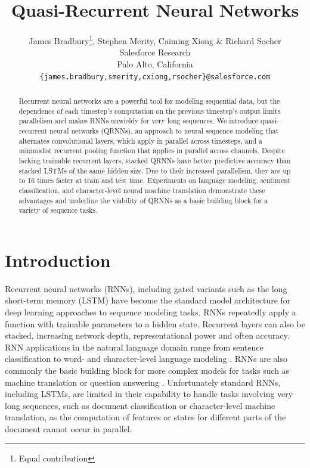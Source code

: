 \documentclass{article} %
\title{Quasi-Recurrent Neural Networks}
\author{James Bradbury\thanks{Equal contribution}, Stephen Merity\footnotemark[1], Caiming Xiong \& Richard Socher \\
Salesforce Research\\
Palo Alto, California \\
\texttt{\{james.bradbury,smerity,cxiong,rsocher\}@salesforce.com}}
\begin{document}
\maketitle

\begin{abstract}
Recurrent neural networks are a powerful tool for modeling sequential data, but the dependence of each timestep's computation on the previous timestep's output limits parallelism and makes RNNs unwieldy for very long sequences. We introduce quasi-recurrent neural networks (QRNNs), an approach to neural sequence modeling that alternates convolutional layers, which apply in parallel across timesteps, and a minimalist recurrent pooling function that applies in parallel across channels. Despite lacking trainable recurrent layers, stacked QRNNs have better predictive accuracy than stacked LSTMs of the same hidden size. Due to their increased parallelism, they are up to 16 times faster at train and test time.
Experiments on language modeling, sentiment classification, and character-level neural machine translation demonstrate these advantages and underline the viability of QRNNs as a basic building block for a variety of sequence tasks.
\end{abstract}

\section{Introduction}

Recurrent neural networks (RNNs), including gated variants such as the long short-term memory (LSTM) \citep{Hochreiter1997} have become the standard model architecture for deep learning approaches to sequence modeling tasks. RNNs repeatedly apply a function with trainable parameters to a hidden state. Recurrent layers can also be stacked, increasing network depth, representational power and often accuracy.
RNN applications in the natural language domain range from sentence classification \citep{Wang2015}
to word- and character-level language modeling \citep{Zaremba2014}. RNNs are also commonly the basic building block for more complex models for tasks such as machine translation \citep{Bahdanau2015,Luong2015,Bradbury2016} or question answering \citep{Kumar2016,Xiong2016}.
Unfortunately standard RNNs, including LSTMs, are limited in their capability to handle tasks involving very long sequences, such as document classification or character-level machine translation, as the computation of features or states for different parts of the document cannot occur in parallel.
\end{document}
